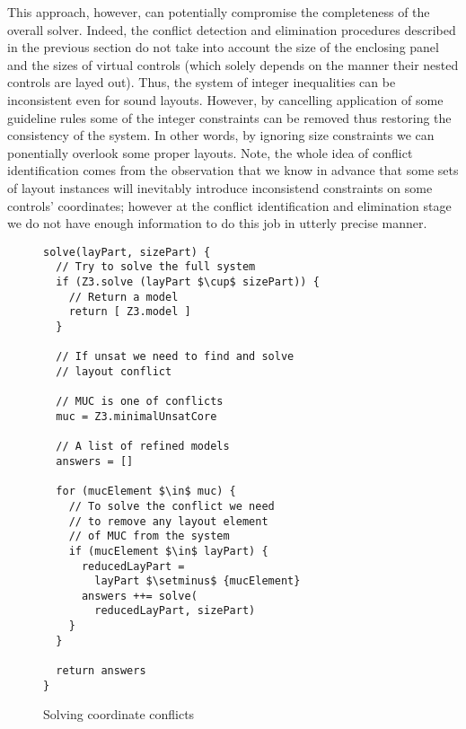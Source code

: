 This approach, however, can potentially compromise the completeness of the overall solver. Indeed, the conflict
detection and elimination procedures described in the previous section do not take into account the size of the
enclosing panel and the sizes of virtual controls (which solely depends on the manner their nested controls are
layed out). Thus, the system of integer inequalities can be inconsistent even for sound layouts. However,
by cancelling application of some guideline rules some of the integer constraints can be removed thus restoring
the consistency of the system. In other words, by ignoring size constraints we can ponentially overlook some
proper layouts. Note, the whole idea of conflict identification comes from the observation that we know
in advance that some sets of layout instances will inevitably introduce inconsistend constraints on
some controls' coordinates; however at the conflict identification and elimination stage we do not have
enough information to do this job in utterly precise manner.

\begin{figure}
\begin{lstlisting}[language=algo,mathescape=true,basicstyle=\ttfamily]
solve(layPart, sizePart) {
  // Try to solve the full system
  if (Z3.solve (layPart $\cup$ sizePart)) {
    // Return a model
    return [ Z3.model ]
  }

  // If unsat we need to find and solve
  // layout conflict

  // MUC is one of conflicts
  muc = Z3.minimalUnsatCore

  // A list of refined models
  answers = []

  for (mucElement $\in$ muc) {
    // To solve the conflict we need
    // to remove any layout element
    // of MUC from the system
    if (mucElement $\in$ layPart) {
      reducedLayPart =
        layPart $\setminus$ {mucElement}
      answers ++= solve(
        reducedLayPart, sizePart)
    }
  }

  return answers
}
\end{lstlisting}
\caption{Solving coordinate conflicts}
\label{Z3op}
\end{figure}

